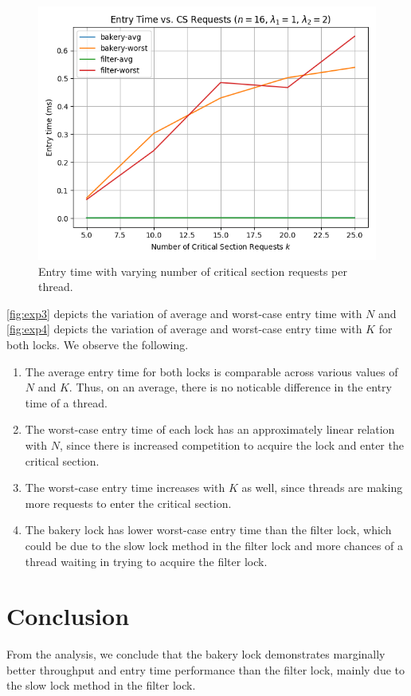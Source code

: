 \documentclass[conference,compsoc]{IEEEtran}
\begin{document}
\begin{figure}[!ht]
    \centering
    \includegraphics[width=\columnwidth]{images/exp4.png} 
    \caption{Entry time with varying number of critical section requests per thread.}
    \label{fig:exp4}
\end{figure}

\autoref{fig:exp3} depicts the variation of average and worst-case entry time
with \(N\) and \autoref{fig:exp4} depicts the variation of average and
worst-case entry time with \(K\) for both locks. We observe the following.

\begin{enumerate}
    \item The average entry time for both locks is comparable across various
    values of \(N\) and \(K\). Thus, on an average, there is no noticable
    difference in the entry time of a thread.
    \item The worst-case entry time of each lock has an approximately linear
    relation with \(N\), since there is increased competition to acquire the
    lock and enter the critical section.
    \item The worst-case entry time increases with \(K\) as well, since threads
    are making more requests to enter the critical section.
    \item The bakery lock has lower worst-case entry time than the filter lock,
    which could be due to the slow lock method in the filter lock and more
    chances of a thread waiting in trying to acquire the filter lock.
\end{enumerate}

\section{Conclusion}
\label{sec:conclusion}

From the analysis, we conclude that the bakery lock demonstrates marginally
better throughput and entry time performance than the filter lock, mainly due to
the slow lock method in the filter lock.
\end{document}
